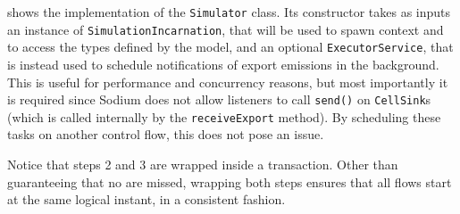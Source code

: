  shows the implementation of the \texttt{Simulator} class.
%
Its constructor takes as inputs an instance of \texttt{SimulationIncarnation}, that will be used to spawn context and to access the types defined by the model, and an optional \texttt{ExecutorService}, that is instead used to schedule notifications of export emissions in the background.
%
This is useful for performance and concurrency reasons, but most importantly it is required since Sodium does not allow listeners to call \texttt{send()} on \texttt{CellSink}s (which is called internally by the \texttt{receiveExport} method).
%
By scheduling these tasks on another control flow, this does not pose an issue.
%


Notice that steps 2 and 3 are wrapped inside a transaction.
%
Other than guaranteeing that no  are missed, wrapping both steps ensures that all flows start at the same logical instant, in a consistent fashion.
